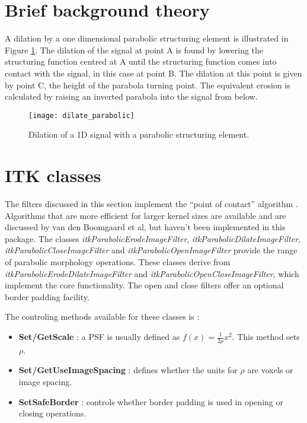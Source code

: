 \documentclass{InsightArticle}
\begin{document}
\section{Brief background theory}
A dilation by a one dimensional parabolic structuring element is
illustrated in Figure \ref{fig:paradilate}. The dilation of the signal
at point A is found by lowering the structuring function centred at A
until the structuring function comes into contact with the signal, in
this case at point B. The dilation at this point is given by point C,
the height of the parabola turning point. The equivalent erosion is
calculated by raising an inverted parabola into the signal from below.

\begin{figure}[htbp]
\centering
\texttt{[image: dilate\_parabolic]}
\caption{Dilation of a 1D signal with a parabolic structuring element.\label{fig:paradilate}}
\end{figure}

\section{ITK classes}
The filters discussed in this section implement the ``point of
contact'' algorithm \cite{Boomgaard96}. Algorithms that are more
efficient for larger kernel sizes are available and are discussed by
van den Boomgaard et al, but haven't been implemented in this package.
The classes {\em itkParabolicErodeImageFilter}, {\em
itkParabolicDilateImageFilter}, {\em itkParabolicCloseImageFilter} and
{\em itkParabolicOpenImageFilter} provide the range of parabolic
morphology operations. These classes derive from {\em
itkParabolicErodeDilateImageFilter} and {\em
itkParabolicOpenCloseImageFilter}, which implement the core
functionality. The open and close filters offer an optional border
padding facility.

The controling methods available for these classes is :
\begin{itemize}
\item {\bf Set/GetScale} : a PSF is usually defined as $f(x)=\frac{1}{2\rho}x^2$. This method sets $\rho$.
\item {\bf Set/GetUseImageSpacing} : defines whether the units for $\rho$ are voxels or image spacing.
\item {\bf SetSafeBorder} : controls whether border padding is used in opening or closing operations.
\end{itemize}



\appendix





\nocite{ITKSoftwareGuide}
\end{document}
